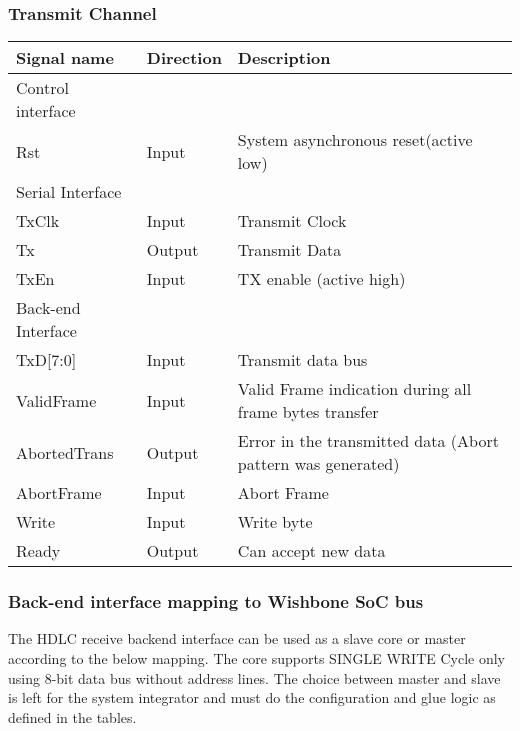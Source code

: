 \documentclass[a4paper,11pt]{article}
\begin{document}
\subsubsection{Transmit Channel}
\begin{tabular}{|l|l|l|}
\hline
Signal name& Direction& Description\\
\hline
\hline
Control interface & & \\
\hline
\hline
Rst & Input & System asynchronous reset(active low)\\
\hline
\hline
Serial Interface & & \\
\hline
\hline
TxClk & Input & Transmit Clock\\
Tx & Output & Transmit Data\\
TxEn & Input & TX enable (active high)\\
\hline
\hline
Back-end Interface & &\\
\hline
\hline
TxD[7:0]& Input & Transmit data bus\\
ValidFrame& Input& Valid Frame indication during all frame bytes transfer\\
AbortedTrans& Output& Error in the transmitted data (Abort pattern was generated)\\
AbortFrame& Input& Abort Frame\\
Write& Input& Write byte\\
Ready& Output& Can accept new data\\
\hline
\end{tabular}
 
 
\subsubsection{Back-end interface mapping to Wishbone SoC bus}
The HDLC receive backend interface can be used as a slave core or master according to the below mapping. The core supports SINGLE WRITE Cycle only using 8-bit data bus without address lines. The choice between master and slave is left for the system integrator and must do the configuration and glue logic as defined in the tables.
 
\end{document}
